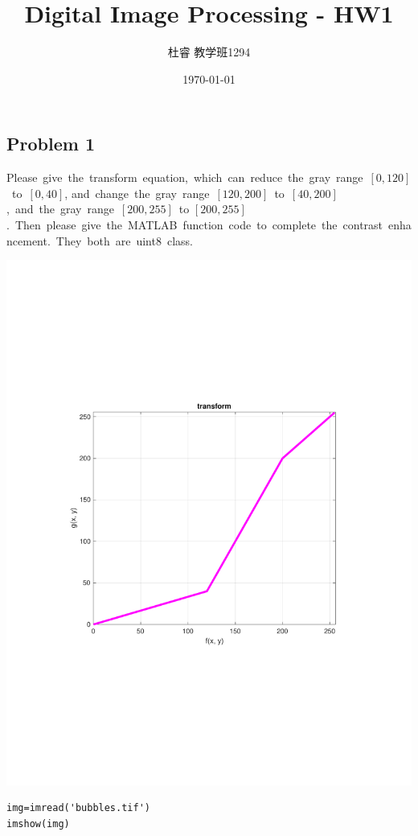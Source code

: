 \documentclass{article}
\title{Digital Image Processing - HW1}
\author{杜睿 教学班1294}
\date{\today}
\begin{document}
\begin{CJK}{UTF8}{gbsn}
\maketitle{}

\section{Problem 1}

Please give the transform equation, which can reduce the gray range $[0, 120]$ to $[0, 40]$,
and change the gray range $[120, 200]$ to $[40, 200]$, and the gray range $[200, 255]$ to $[200, 255]$. Then please give the MATLAB function code to complete the contrast enhancement\cite{19b2749cc0f95d6522a84a3039aea315d92ae9fb}. They both are uint8 class.

{\centering
\includegraphics[width=1\textwidth]{transform.pdf}}

\begin{lstlisting}
img=imread('bubbles.tif')
imshow(img)


\end{lstlisting}
\end{CJK}
\end{document}
